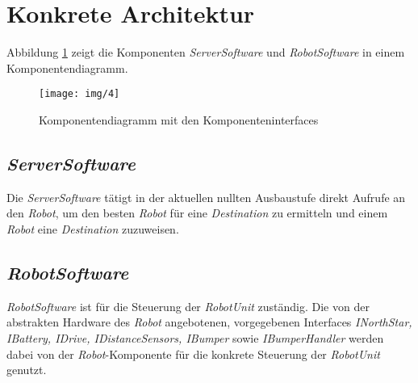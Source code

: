 \section{Konkrete Architektur}

Abbildung \ref{KomponentendiagrammKonkret} zeigt die Komponenten \emph{ServerSoftware} und \emph{RobotSoftware} in einem Komponentendiagramm. 

\begin{figure}[H]
\centering
\texttt{[image: img/4]}
\caption{Komponentendiagramm mit den Komponenteninterfaces}
\label{KomponentendiagrammKonkret}
\end{figure}

\subsection{\textit{ServerSoftware}}

Die \emph{ServerSoftware} tätigt in der aktuellen nullten Ausbaustufe direkt Aufrufe an den \textit{Robot},
um den besten \textit{Robot} für eine \textit{Destination} zu ermitteln und einem \textit{Robot} eine \textit{Destination} zuzuweisen.

\subsection{\textit{RobotSoftware}}

\emph{RobotSoftware} ist für die Steuerung der \textit{RobotUnit} zuständig. Die von der abstrakten Hardware
des \textit{Robot} angebotenen, vorgegebenen Interfaces \textit{INorthStar, IBattery, IDrive, IDistanceSensors, IBumper} sowie
\textit{IBumperHandler} werden dabei von der \textit{Robot}-Komponente für die konkrete Steuerung der \textit{RobotUnit} genutzt.
